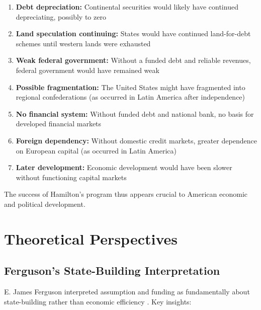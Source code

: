 \documentclass[12pt]{article}
\begin{document}
\begin{enumerate}
\item \textbf{Debt depreciation:} Continental securities would likely have continued depreciating, possibly to zero

\item \textbf{Land speculation continuing:} States would have continued land-for-debt schemes until western lands were exhausted

\item \textbf{Weak federal government:} Without a funded debt and reliable revenues, federal government would have remained weak

\item \textbf{Possible fragmentation:} The United States might have fragmented into regional confederations (as occurred in Latin America after independence)

\item \textbf{No financial system:} Without funded debt and national bank, no basis for developed financial markets

\item \textbf{Foreign dependency:} Without domestic credit markets, greater dependence on European capital (as occurred in Latin America)

\item \textbf{Later development:} Economic development would have been slower without functioning capital markets
\end{enumerate}

The success of Hamilton's program thus appears crucial to American economic and political development.

\section{Theoretical Perspectives}\label{sec:theory}

\subsection{Ferguson's State-Building Interpretation}

E. James Ferguson interpreted assumption and funding as fundamentally about state-building rather than economic efficiency \citep{Ferguson1961}. Key insights:
\end{document}
